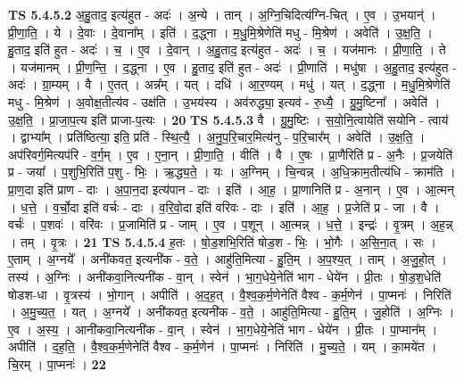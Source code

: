 \documentclass[17pt]{extarticle}
\begin{document}
                  \newline
                                \textbf{ TS 5.4.5.2} \newline
                  अ॒हु॒ताद॒ इत्य॑हुत - अदः॑ । अ॒न्ये । तान् । अ॒ग्नि॒चिदित्य॑ग्नि-चित् । ए॒व । उ॒भयान्॑ । प्री॒णा॒ति॒ । ये । दे॒वाः । दे॒वाना᳚म् । इति॑ । द॒द्ध्ना । म॒धु॒मि॒श्रेणेति॑ मधु - मि॒श्रेण॑ । अवेति॑ । उ॒क्ष॒ति॒ । हु॒ताद॒ इति॑ हुत - अदः॑ । च॒ । ए॒व । दे॒वान् । अ॒हु॒ताद॒ इत्य॑हुत - अदः॑ । च॒ । यज॑मानः । प्री॒णा॒ति॒ । ते । यज॑मानम् । प्री॒ण॒न्ति॒ । द॒द्ध्ना । ए॒व । हु॒ताद॒ इति॑ हुत - अदः॑ । प्री॒णाति॑ । मधु॑षा । अ॒हु॒ताद॒ इत्य॑हुत - अदः॑ । ग्रा॒म्यम् । वै । ए॒तत् । अन्न᳚म् । यत् । दधि॑ । आ॒र॒ण्यम् । मधु॑ । यत् । द॒द्ध्ना । म॒धु॒मि॒श्रेणेति॑ मधु - मि॒श्रेण॑ । अ॒वोक्ष॒तीत्य॑व - उक्ष॑ति । उ॒भय॑स्य । अव॑रुद्ध्या॒ इत्यव॑ - रु॒ध्यै॒ । ग्रु॒मु॒ष्टिना᳚ । अवेति॑ । उ॒क्ष॒ति॒ । प्रा॒जा॒प॒त्य इति॑ प्राजा-प॒त्यः । \textbf{  20} \newline
                  \newline
                                \textbf{ TS 5.4.5.3} \newline
                  वै । ग्रु॒मु॒ष्टिः । स॒यो॒नि॒त्वायेति॑ सयोनि - त्वाय॑ । द्वाभ्या᳚म् । प्रति॑ष्ठित्या॒ इति॒ प्रति॑ - स्थि॒त्यै॒ । अ॒नु॒प॒रि॒चार॒मित्य॑नु - प॒रि॒चार᳚म् । अवेति॑ । उ॒क्ष॒ति॒ । अप॑रिवर्ग॒मित्यप॑रि - व॒र्ग॒म् । ए॒व । ए॒ना॒न् । प्री॒णा॒ति॒ । वीति॑ । वै । ए॒षः । प्रा॒णैरिति॑ प्र - अ॒नैः । प्र॒जयेति॑ प्र - जया᳚ । प॒शुभि॒रिति॑ प॒शु - भिः॒ । ऋ॒द्ध्य॒ते॒ । यः । अ॒ग्निम् । चि॒न्वन्न् । अ॒धि॒क्राम॒तीत्य॑धि - क्राम॑ति । प्रा॒ण॒दा इति॑ प्राण - दाः । अ॒पा॒न॒दा इत्य॑पान - दाः । इति॑ । आ॒ह॒ । प्रा॒णानिति॑ प्र - अ॒नान् । ए॒व । आ॒त्मन् । ध॒त्ते॒ । व॒र्चो॒दा इति॑ वर्चः - दाः । व॒रि॒वो॒दा इति॑ वरिवः - दाः । इति॑ । आ॒ह॒ । प्र॒जेति॑ प्र - जा । वै । वर्चः॑ । प॒शवः॑ । वरि॑वः । प्र॒जामिति॑ प्र - जाम् । ए॒व । प॒शून् । आ॒त्मन्न् । ध॒त्ते॒ । इन्द्रः॑ । वृ॒त्रम् । अ॒ह॒न्न् । तम् । वृ॒त्रः । \textbf{  21} \newline
                  \newline
                                \textbf{ TS 5.4.5.4} \newline
                  ह॒तः । षो॒ड॒शभि॒रिति॑ षोड॒श - भिः॒ । भो॒गैः । अ॒सि॒ना॒त् । सः । ए॒ताम् । अ॒ग्नये᳚ । अनी॑कवत॒ इत्यनी॑क - व॒ते॒ । आहु॑ति॒मित्या - हु॒ति॒म् । अ॒प॒श्य॒त् । ताम् । अ॒जु॒हो॒त् । तस्य॑ । अ॒ग्निः । अनी॑कवा॒नित्यनी॑क - वा॒न् । स्वेन॑ । भा॒ग॒धेये॒नेति॑ भाग - धेये॑न । प्री॒तः । षो॒ड॒श॒धेति॑ षोडश-धा । वृ॒त्रस्य॑ । भो॒गान् । अपीति॑ । अ॒द॒ह॒त् । वै॒श्व॒क॒र्म॒णेनेति॑ वैश्व - क॒र्म॒णेन॑ । पा॒प्मनः॑ । निरिति॑ । अ॒मु॒च्य॒त॒ । यत् । अ॒ग्नये᳚ । अनी॑कवत॒ इत्यनी॑क - व॒ते॒ । आहु॑ति॒मित्या - हु॒ति॒म् । जु॒होति॑ । अ॒ग्निः । ए॒व । अ॒स्य॒ । आनी॑कवा॒नित्यनी॑क - वा॒न् । स्वेन॑ । भा॒ग॒धेये॒नेति॑ भाग - धेये॑न । प्री॒तः । पा॒प्मान᳚म् । अपीति॑ । द॒ह॒ति॒ । वै॒श्व॒क॒र्म॒णेनेति॑ वैश्व - क॒र्म॒णेन॑ । पा॒प्मनः॑ । निरिति॑ । मु॒च्य॒ते॒ । यम् । का॒मये॑त । चि॒रम् । पा॒प्मनः॑ । \textbf{  22} \newline
\end{document}
